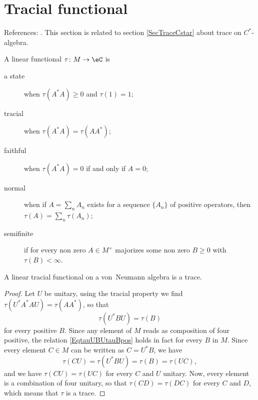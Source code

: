 					\section{Tracial functional}
\label{SecTracevonNeuman}

References: \cite{TrioloSemifinite,DixmierTrace}. This section is related to section \ref{SecTraceCstar} about trace on $C^*$-algebra.

A linear functional $\tau\colon M\to \eC$ is
\begin{description}
	\item[a state] when $\tau(A^*A)\geq0$ and $\tau(1)=1$;
	\item[tracial] when $\tau(A^*A)=\tau(AA^*)$;
	\item[faithful] when $\tau(A^*A)=0$ if and only if $A=0$;
	\item[normal] when if $A=\sum_n A_n$ exists for a sequence $\{ A_n \}$ of positive operators, then $\tau(A)=\sum_n\tau(A_n)$;
	\item[semifinite] if for every non zero $A\in M^+$ majorizes some non zero $B\geq 0$ with $\tau(B)<\infty$.
\end{description}

\begin{lemma}
A linear tracial functional on a von~Neumann algebra is a trace.
\end{lemma}

\begin{proof}
Let $U$ be unitary, using the tracial property we find $\tau(U^*A^*AU)=\tau(AA^*)$, so that
\begin{equation}	\label{EqtauUBUtauBpos}
	\tau(U^*BU)=\tau(B)
\end{equation}
for every positive $B$. Since any element of $M$ reads as composition of four positive, the relation \eqref{EqtauUBUtauBpos} holds in fact for every $B$ in $M$. Since every element $C\in M$ can be written as $C=U^*B$, we have
\[ 
	\tau(CU)=\tau(U^*BU)=\tau(B)=\tau(UC),
\]
and we have $\tau(CU)=\tau(UC)$ for every $C$ and $U$ unitary. Now, every element is a combination of four unitary, so that $\tau(CD)=\tau(DC)$ for every $C$ and $D$, which means that $\tau$ is a trace.
\end{proof}

